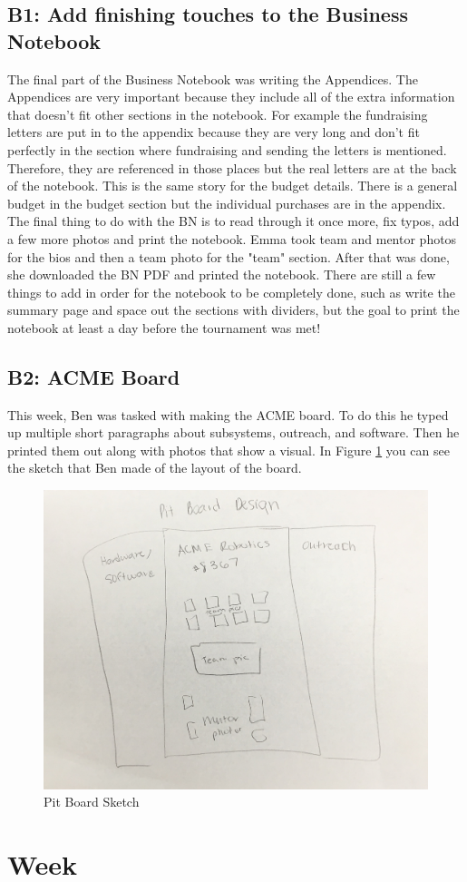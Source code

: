 \documentclass{article}
\begin{document}
\subsection{B1: Add finishing touches to the Business Notebook}

The final part of the Business Notebook was writing the Appendices. The Appendices are very important because they include all of the extra information that doesn't fit other sections in the notebook. For example the fundraising letters are put in to the appendix because they are very long and don't fit perfectly in the section where fundraising and sending the letters is mentioned. Therefore, they are referenced in those places but the real letters are at the back of the notebook. This is the same story for the budget details. There is a general budget in the budget section but the individual purchases are in the appendix. \\
The final thing to do with the BN is to read through it once more, fix typos, add a few more photos and print the notebook. Emma took team and mentor photos for the bios and then a team photo for the "team" section. After that was done, she downloaded the BN PDF and printed the notebook. There are still a few things to add in order for the notebook to be completely done, such as write the summary page and space out the sections with dividers, but the goal to print the notebook at least a day before the tournament was met!

\subsection{B2: ACME Board}

This week, Ben was tasked with making the ACME board. To do this he typed up multiple short paragraphs about subsystems, outreach, and software. Then he printed them out along with photos that show a visual. In Figure \ref{fig:pitboard} you can see the sketch that Ben made of the layout of the board. 

\begin{figure}
    \centering
    \includegraphics[width=.6 \textwidth]{10_11-05/images/pit_board.jpg}
    \caption{Pit Board Sketch}
    \label{fig:pitboard}
\end{figure}
\clearpage \newpage \section{Week \thesection} 
\end{document}
